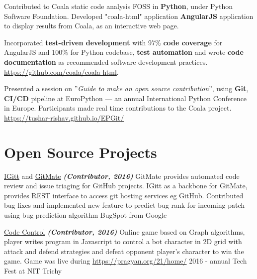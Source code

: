 \documentclass[]{deedy-resume-openfont}
\begin{document}
\begin{minipage}[t]{0.66\textwidth}
\begin{tightemize}     
\item Contributed to Coala \textemdash static code analysis FOSS \textemdash in \textbf{Python}, under Python Software Foundation. Developed "coala-html" application \textemdash \textbf{AngularJS} application to display results from Coala, as an interactive web page.
\item Incorporated \textbf{test-driven development} with 97\%    \textbf{code coverage} for AngularJS and 100\% for Python codebase, \textbf{test automation} and wrote \textbf{code documentation} as recommended software development practices. \href{https://github.com/coala/coala-html}{https://github.com/coala/coala-html}.
\end{tightemize}
\sectionsep

\begin{tightemize}
\item Presented a session on ”\textit{Guide to make an open source contribution}”, using \textbf{Git}, \textbf{CI/CD} pipeline at EuroPython — an annual International Python Conference in Europe. Participants made real time contributions to the Coala project. \href{https://tushar-rishav.github.io/EPGit/}{https://tushar-rishav.github.io/EPGit/}
\end{tightemize}
\sectionsep

\section{Open Source Projects}
\vspace{\topsep}
\begin{tightemize}
\item \href{https://gitlab.com/gitmate/open-source/IGitt}{\underline {IGitt}} and \href{https://gitlab.com/gitmate/open-source/gitmate-2}{\underline {GitMate}} {\footnotesize \textit{\textbf{(Contributor, 2016) }}} \textemdash GitMate provides automated code review and issue triaging for GitHub projects. IGitt as a backbone for GitMate, provides REST interface to access git hosting services eg GitHub. Contributed bug fixes and implemented new feature to predict bug rank for incoming patch using bug prediction algorithm BugSpot from Google \\
\item \href{https://github.com/ash7594/code-control/commits?author=tushar-rishav}{\underline {Code Control}} {\footnotesize \textit{\textbf{(Contributor, 2016) }}} \textemdash Online game based on Graph algorithms, player writes program in Javascript to control a bot character in 2D grid with attack and defend strategies and defeat opponent player’s character to win the game. Game was live during \href{Pragyan}{https://pragyan.org/21/home/} 2016 - annual Tech Fest at NIT Trichy
\end{tightemize}
\sectionsep

\end{minipage} 
\end{document}
